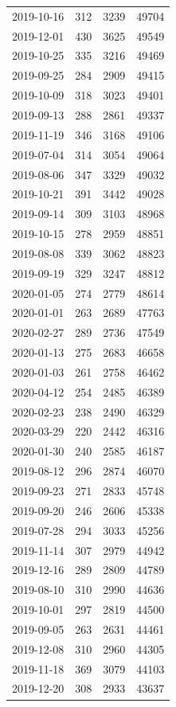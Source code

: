 \begin{tabular}{lrrr}
2019-10-16 & 312 & 3239 & 49704 \\
2019-12-01 & 430 & 3625 & 49549 \\
2019-10-25 & 335 & 3216 & 49469 \\
2019-09-25 & 284 & 2909 & 49415 \\
2019-10-09 & 318 & 3023 & 49401 \\
2019-09-13 & 288 & 2861 & 49337 \\
2019-11-19 & 346 & 3168 & 49106 \\
2019-07-04 & 314 & 3054 & 49064 \\
2019-08-06 & 347 & 3329 & 49032 \\
2019-10-21 & 391 & 3442 & 49028 \\
2019-09-14 & 309 & 3103 & 48968 \\
2019-10-15 & 278 & 2959 & 48851 \\
2019-08-08 & 339 & 3062 & 48823 \\
2019-09-19 & 329 & 3247 & 48812 \\
2020-01-05 & 274 & 2779 & 48614 \\
2020-01-01 & 263 & 2689 & 47763 \\
2020-02-27 & 289 & 2736 & 47549 \\
2020-01-13 & 275 & 2683 & 46658 \\
2020-01-03 & 261 & 2758 & 46462 \\
2020-04-12 & 254 & 2485 & 46389 \\
2020-02-23 & 238 & 2490 & 46329 \\
2020-03-29 & 220 & 2442 & 46316 \\
2020-01-30 & 240 & 2585 & 46187 \\
2019-08-12 & 296 & 2874 & 46070 \\
2019-09-23 & 271 & 2833 & 45748 \\
2019-09-20 & 246 & 2606 & 45338 \\
2019-07-28 & 294 & 3033 & 45256 \\
2019-11-14 & 307 & 2979 & 44942 \\
2019-12-16 & 289 & 2809 & 44789 \\
2019-08-10 & 310 & 2990 & 44636 \\
2019-10-01 & 297 & 2819 & 44500 \\
2019-09-05 & 263 & 2631 & 44461 \\
2019-12-08 & 310 & 2960 & 44305 \\
2019-11-18 & 369 & 3079 & 44103 \\
2019-12-20 & 308 & 2933 & 43637 \\

\end{tabular}

